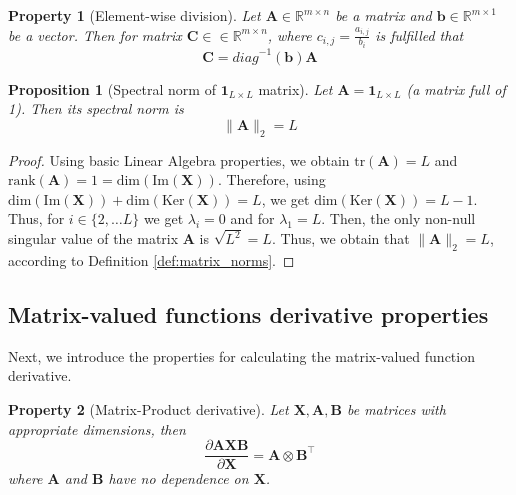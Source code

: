 \documentclass{article}
\newtheorem{proposition}{Proposition}
\newtheorem{property}{Property}
\begin{document}
\begin{property}[Element-wise division] \label{prop:elem_wise_division}
    Let $\mathbf{A} \in \mathbb{R}^{m\times n}$ be a matrix and $\mathbf{b} \in \mathbb{R}^{m \times 1}$ be a vector. Then for matrix $\mathbf{C} \in {\in \mathbb{R}^{m \times n}}$, where $c_{i,j} = \frac{a_{i,j}}{b_i}$ is fulfilled that
    \begin{equation*}
        \mathbf{C} = \textit{diag}^{-1}(\mathbf{b})\mathbf{A}
    \end{equation*}
\end{property}

\begin{proposition} [Spectral norm of $\mathbf{1}_{L \times L}$ matrix] \label{prop:1_spectral_norm}
    Let $\mathbf{A} = \mathbf{1}_{L \times L}$ (a matrix full of 1). Then its spectral norm is
    \begin{equation*}
        \| \mathbf{A}\|_2 = L
    \end{equation*}
\end{proposition}

\begin{proof}
    Using basic Linear Algebra properties, we obtain $\mathrm{tr}(\mathbf{A}) = L$ and $\mathrm{rank}(\mathbf{A}) = 1 = \mathrm{dim}(\mathrm{Im}(\mathbf{X}))$. Therefore, using $\mathrm{dim}(\mathrm{Im}(\mathbf{X})) + \mathrm{dim}(\mathrm{Ker}(\mathbf{X})) = L$, we get $\mathrm{dim}(\mathrm{Ker}(\mathbf{X})) = L - 1$. Thus, for $i \in \{2, \dots L\}$ we get $\lambda_i = 0$ and for $\lambda_1 = L$. Then, the only non-null singular value of the matrix $\mathbf{A}$ is $\sqrt{L^2} = L$. Thus, we obtain that $\| \mathbf{A}\|_2 = L$, according to Definition \ref{def:matrix_norms}.
\end{proof}
    
\subsection{Matrix-valued functions derivative properties}

Next, we introduce the properties for calculating the matrix-valued function derivative.

\begin{property} [Matrix-Product derivative] \label{prop:matrix_product_derivative}
    Let $\mathbf{X}, \mathbf{A}, \mathbf{B}$ be matrices with appropriate dimensions, then
    \begin{equation*}
        \frac{\partial\mathbf{A}\mathbf{X}\mathbf{B}}{\partial\mathbf{X}} = \mathbf{A} \otimes \mathbf{B}^\top
    \end{equation*}
    where $\mathbf{A}$ and $\mathbf{B}$ have no dependence on $\mathbf{X}$.
\end{property}
\end{document}
